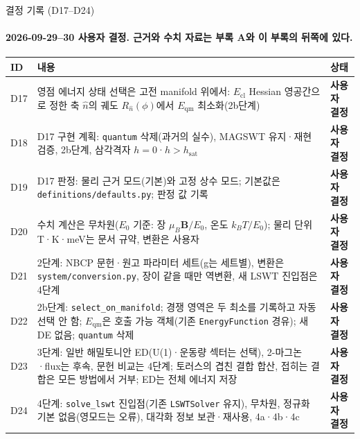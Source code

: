\begin{frame}[label=decisions-selection]{결정 기록 (D17--D24)}
  \framesubtitle{2026-09-29--30 사용자 결정. 근거와 수치 자료는 부록 A와 이 부록의 뒤쪽에 있다.}
  \footnotesize\renewcommand{\arraystretch}{1.08}
  \begin{tabularx}{\textwidth}{@{}p{0.7cm}YP{2.5cm}@{}}
    \toprule
    ID & 내용 & 상태 \\
    \midrule
    D17 & 영점 에너지 상태 선택은 고전 manifold 위에서: $E_{\mathrm{cl}}$ Hessian 영공간으로 정한 축 $\hat n$의 궤도 $R_{\hat n}(\phi)$에서 $E_{\mathrm{qm}}$ 최소화(2b단계) & \textbf{사용자 결정} \\
    D18 & D17 구현 계획: \texttt{quantum} 삭제(과거의 실수), MAGSWT 유지·재현 검증, 2b단계, 삼각격자 $h=0$·$h>h_{\mathrm{sat}}$ & \textbf{사용자 결정} \\
    D19 & D17 판정: 물리 근거 모드(기본)와 고정 상수 모드; 기본값은 \texttt{definitions/defaults.py}; 판정 값 기록 & \textbf{사용자 결정} \\
    D20 & 수치 계산은 무차원($E_0$ 기준: 장 $\mu_B\mathbf B/E_0$, 온도 $k_BT/E_0$); 물리 단위 T·K·meV는 문서 규약, 변환은 사용자 & \textbf{사용자 결정} \\
    D21 & 2단계: NBCP 문헌·원고 파라미터 세트(g는 세트별), 변환은 \texttt{system/conversion.py}, 장이 같을 때만 역변환, 새 LSWT 진입점은 4단계 & \textbf{사용자 결정} \\
    D22 & 2b단계: \texttt{select\_on\_manifold}; 경쟁 영역은 두 최소를 기록하고 자동 선택 안 함; $E_{\mathrm{qm}}$은 호출 가능 객체(기존 \texttt{EnergyFunction} 경유); 새 DE 없음; \texttt{quantum} 삭제 & \textbf{사용자 결정} \\
    D23 & 3단계: 일반 해밀토니안 ED(U(1)·운동량 섹터는 선택), 2-마그논·flux는 후속, 문헌 비교는 4단계; 토러스의 겹친 결합 합산, 접히는 결합은 모든 방법에서 거부; ED는 전체 에너지 저장 & \textbf{사용자 결정} \\
    D24 & 4단계: \texttt{solve\_lswt} 진입점(기존 \texttt{LSWTSolver} 유지), 무차원, 정규화 기본 없음(영모드는 오류), 대각화 정보 보관·재사용, 4a·4b·4c & \textbf{사용자 결정} \\
    \bottomrule
  \end{tabularx}
  \par\smallskip
\end{frame}

